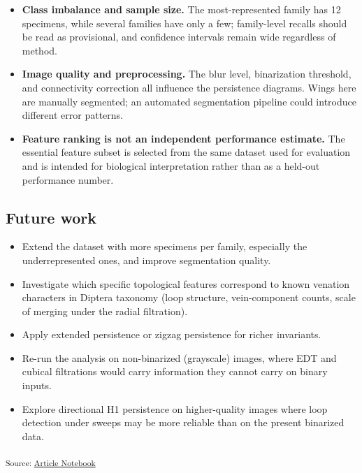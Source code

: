 \documentclass[
  a4paper,
  DIV=11,
  numbers=noendperiod]{scrartcl}
\providecommand{\tightlist}{%
  \setlength{\itemsep}{0pt}\setlength{\parskip}{0pt}}
\begin{document}
\begin{itemize}
\tightlist
\item
  \textbf{Class imbalance and sample size.} The most-represented family
  has 12 specimens, while several families have only a few; family-level
  recalls should be read as provisional, and confidence intervals remain
  wide regardless of method.
\item
  \textbf{Image quality and preprocessing.} The blur level, binarization
  threshold, and connectivity correction all influence the persistence
  diagrams. Wings here are manually segmented; an automated segmentation
  pipeline could introduce different error patterns.
\item
  \textbf{Feature ranking is not an independent performance estimate.}
  The essential feature subset is selected from the same dataset used
  for evaluation and is intended for biological interpretation rather
  than as a held-out performance number.
\end{itemize}

\subsection{Future work}\label{future-work}

\begin{itemize}
\tightlist
\item
  Extend the dataset with more specimens per family, especially the
  underrepresented ones, and improve segmentation quality.
\item
  Investigate which specific topological features correspond to known
  venation characters in Diptera taxonomy (loop structure,
  vein-component counts, scale of merging under the radial filtration).
\item
  Apply extended persistence or zigzag persistence for richer
  invariants.
\item
  Re-run the analysis on non-binarized (grayscale) images, where EDT and
  cubical filtrations would carry information they cannot carry on
  binary inputs.
\item
  Explore directional H1 persistence on higher-quality images where loop
  detection under sweeps may be more reliable than on the present
  binarized data.
\end{itemize}

\textsubscript{Source:
\href{https://JuliaTDA.github.io/tda-fly/index.qmd.html}{Article
Notebook}}


\printbibliography
\end{document}
